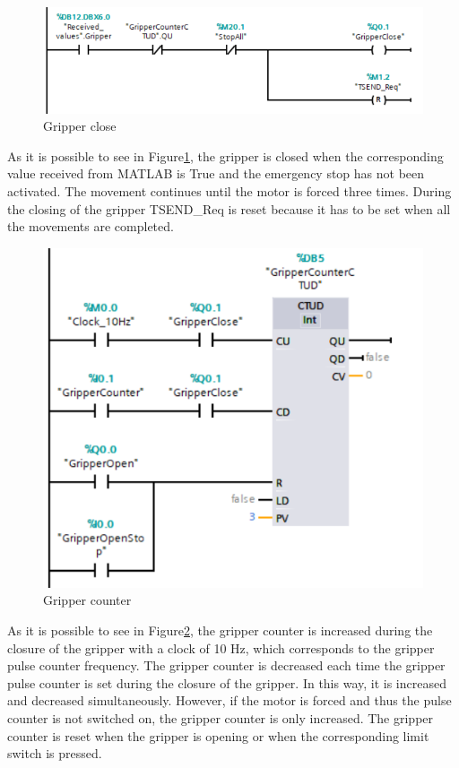 \begin{figure}[!h]
\begin{center}
\includegraphics[width=0.6\linewidth]{capitolo3/figure/Segmento1_2_GC.PNG}
\caption{Gripper close}
\label{fig:gripper_close}
\end{center}
\end{figure}

As it is possible  to see in Figure\ref{fig:gripper_close}, the gripper is closed when the corresponding value received from MATLAB is True and the emergency stop has not been activated. The movement continues until the motor is forced three times. During the closing of the gripper TSEND\_Req is reset because it has to be set when all the movements are completed.

\begin{figure}[!h]
\begin{center}
\includegraphics[width=0.6\linewidth]{capitolo3/figure/Segmento1_9.PNG}
\caption{Gripper counter}
\label{fig:gripper_counter}
\end{center}
\end{figure}

As it is possible  to see in Figure\ref{fig:gripper_counter}, the gripper counter is increased during the closure of the gripper with a clock of 10 Hz, which corresponds to the gripper pulse counter frequency. The gripper counter is decreased each time the gripper pulse counter is set during the closure of the gripper. In this way, it is increased and decreased simultaneously. However, if the motor is forced and thus the pulse counter is not switched on, the gripper counter is only increased. The gripper counter is reset when the gripper is opening or when the corresponding limit switch is pressed.

